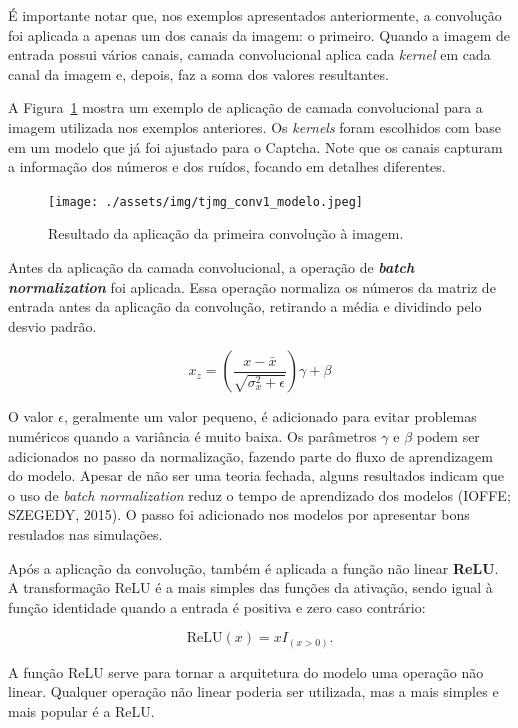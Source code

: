 \documentclass[12pt,twoside,brazilian]{book}
\begin{document}
É importante notar que, nos exemplos apresentados anteriormente, a
convolução foi aplicada a apenas um dos canais da imagem: o primeiro.
Quando a imagem de entrada possui vários canais, camada convolucional
aplica cada \emph{kernel} em cada canal da imagem e, depois, faz a soma
dos valores resultantes.

A Figura~\ref{fig-tjmg-exemplo-camada-conv} mostra um exemplo de
aplicação de camada convolucional para a imagem utilizada nos exemplos
anteriores. Os \emph{kernels} foram escolhidos com base em um modelo que
já foi ajustado para o Captcha. Note que os canais capturam a informação
dos números e dos ruídos, focando em detalhes diferentes.

\begin{figure}

{\centering \texttt{[image: ./assets/img/tjmg\_conv1\_modelo.jpeg]}

}

\caption{\label{fig-tjmg-exemplo-camada-conv}Resultado da aplicação da
primeira convolução à imagem.}

\end{figure}

Antes da aplicação da camada convolucional, a operação de
\textbf{\emph{batch normalization}} foi aplicada. Essa operação
normaliza os números da matriz de entrada antes da aplicação da
convolução, retirando a média e dividindo pelo desvio padrão.

\[
x_z = \left(\frac{x-\bar x}{\sqrt{\sigma^2_x + \epsilon}}\right) \gamma + \beta
\]

O valor \(\epsilon\), geralmente um valor pequeno, é adicionado para
evitar problemas numéricos quando a variância é muito baixa. Os
parâmetros \(\gamma\) e \(\beta\) podem ser adicionados no passo da
normalização, fazendo parte do fluxo de aprendizagem do modelo. Apesar
de não ser uma teoria fechada, alguns resultados indicam que o uso de
\emph{batch normalization} reduz o tempo de aprendizado dos modelos
(IOFFE; SZEGEDY, 2015). O passo foi adicionado nos modelos por
apresentar bons resulados nas simulações.

Após a aplicação da convolução, também é aplicada a função não linear
\textbf{ReLU}. A transformação ReLU é a mais simples das funções da
ativação, sendo igual à função identidade quando a entrada é positiva e
zero caso contrário:

\[
\text{ReLU}(x) = xI_{(x>0)}.
\]

A função ReLU serve para tornar a arquitetura do modelo uma operação não
linear. Qualquer operação não linear poderia ser utilizada, mas a mais
simples e mais popular é a ReLU.
\end{document}
